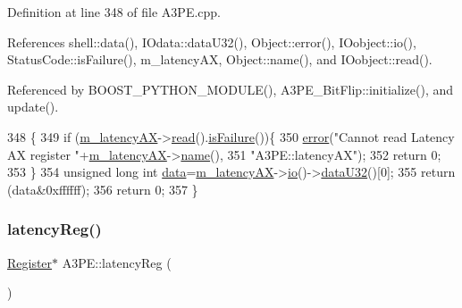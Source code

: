 Definition at line 348 of file A3\+P\+E.\+cpp.



References shell\+::data(), I\+Odata\+::data\+U32(), Object\+::error(), I\+Oobject\+::io(), Status\+Code\+::is\+Failure(), m\+\_\+latency\+AX, Object\+::name(), and I\+Oobject\+::read().



Referenced by B\+O\+O\+S\+T\+\_\+\+P\+Y\+T\+H\+O\+N\+\_\+\+M\+O\+D\+U\+L\+E(), A3\+P\+E\+\_\+\+Bit\+Flip\+::initialize(), and update().


\begin{DoxyCode}
348                             \{
349   \textcolor{keywordflow}{if} (\hyperlink{classA3PE_a061472eb539bb6ac99f4fa11a760eeaf}{m\_latencyAX}->\hyperlink{classIOobject_aa07610c11963b1db6710e3c76ceea456}{read}().\hyperlink{classStatusCode_a5dd22dc6eb2c52fc4cabc58f6dea2eb7}{isFailure}())\{
350     \hyperlink{classObject_a204a95f57818c0f811933917a30eff45}{error}(\textcolor{stringliteral}{"Cannot read Latency AX register "}+\hyperlink{classA3PE_a061472eb539bb6ac99f4fa11a760eeaf}{m\_latencyAX}->\hyperlink{classObject_a300f4c05dd468c7bb8b3c968868443c1}{name}(),
351         \textcolor{stringliteral}{"A3PE::latencyAX"});
352     \textcolor{keywordflow}{return} 0;
353   \}
354   \textcolor{keywordtype}{unsigned} \textcolor{keywordtype}{long} \textcolor{keywordtype}{int} \hyperlink{namespaceshell_a5ea2525995cedc3efd69ea8a7f034d1e}{data}=\hyperlink{classA3PE_a061472eb539bb6ac99f4fa11a760eeaf}{m\_latencyAX}->\hyperlink{classIOobject_af04fb94137c3d86849f478ac5afab5d1}{io}()->\hyperlink{classIOdata_ab0e3cd09f46c1c3712f797116f6da074}{dataU32}()[0];
355   \textcolor{keywordflow}{return} (data&0xffffff);
356   \textcolor{keywordflow}{return} 0;
357 \}
\end{DoxyCode}
\mbox{\label{classA3PE_a42dad20d5a1482431e73c64250b76185}} 
\subsubsection{\texorpdfstring{latency\+Reg()}{latencyReg()}}
{\footnotesize\ttfamily \hyperlink{classRegister}{Register}$\ast$ A3\+P\+E\+::latency\+Reg (\begin{DoxyParamCaption}{ }\end{DoxyParamCaption})\hspace{0.3cm}{\ttfamily [inline]}}



